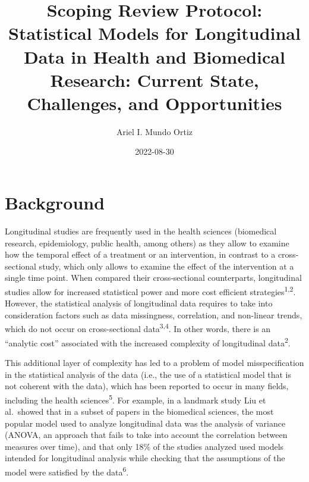 \documentclass[
]{article}
\title{Scoping Review Protocol: Statistical Models for Longitudinal Data
in Health and Biomedical Research: Current State, Challenges, and
Opportunities}
\author{Ariel I. Mundo Ortiz}
\date{2022-08-30}
\renewcommand*\contentsname{Table of contents}
\newcommand\contentsname{Table of contents}
\begin{document}
\maketitle
\ifdefined\Shaded\renewenvironment{Shaded}{\begin{tcolorbox}[borderline west={3pt}{0pt}{shadecolor}, enhanced, frame hidden, breakable, boxrule=0pt, interior hidden, sharp corners]}{\end{tcolorbox}}\fi

\renewcommand*\contentsname{Table of contents}
{
\hypersetup{linkcolor=}
\setcounter{tocdepth}{3}
\tableofcontents
}
\hypertarget{background}{%
\section{Background}\label{background}}

Longitudinal studies are frequently used in the health sciences
(biomedical research, epidemiology, public health, among others) as they
allow to examine how the temporal effect of a treatment or an
intervention, in contrast to a cross-sectional study, which only allows
to examine the effect of the intervention at a single time point. When
compared their cross-sectional counterparts, longitudinal studies allow
for increased statistical power and more cost efficient
strategies\textsuperscript{1,2}. However, the statistical analysis of
longitudinal data requires to take into consideration factors such as
data missingness, correlation, and non-linear trends, which do not occur
on cross-sectional data\textsuperscript{3,4}. In other words, there is
an ``analytic cost'' associated with the increased complexity of
longitudinal data\textsuperscript{2}.

This additional layer of complexity has led to a problem of model
misspecification in the statistical analysis of the data (i.e., the use
of a statistical model that is not coherent with the data), which has
been reported to occur in many fields, including the health
sciences\textsuperscript{5}. For example, in a landmark study Liu et
al.~showed that in a subset of papers in the biomedical sciences, the
most popular model used to analyze longitudinal data was the analysis of
variance (ANOVA, an approach that fails to take into account the
correlation between measures over time), and that only 18\% of the
studies analyzed used models intended for longitudinal analysis while
checking that the assumptions of the model were satisfied by the
data\textsuperscript{6}.
\end{document}
